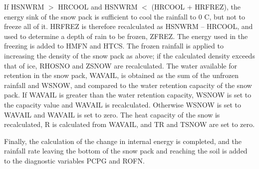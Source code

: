 If H\+S\+N\+W\+R\+M $>$ H\+R\+C\+O\+O\+L and H\+S\+N\+W\+R\+M $<$ (H\+R\+C\+O\+O\+L + H\+R\+F\+R\+E\+Z), the energy sink of the snow pack is sufficient to cool the rainfall to 0 C, but not to freeze all of it. H\+R\+F\+R\+E\+Z is therefore recalculated as H\+S\+N\+W\+R\+M – H\+R\+C\+O\+O\+L, and used to determine a depth of rain to be frozen, Z\+F\+R\+E\+Z. The energy used in the freezing is added to H\+M\+F\+N and H\+T\+C\+S. The frozen rainfall is applied to increasing the density of the snow pack as above; if the calculated density exceeds that of ice, R\+H\+O\+S\+N\+O and Z\+S\+N\+O\+W are recalculated. The water available for retention in the snow pack, W\+A\+V\+A\+I\+L, is obtained as the sum of the unfrozen rainfall and W\+S\+N\+O\+W, and compared to the water retention capacity of the snow pack. If W\+A\+V\+A\+I\+L is greater than the water retention capacity, W\+S\+N\+O\+W is set to the capacity value and W\+A\+V\+A\+I\+L is recalculated. Otherwise W\+S\+N\+O\+W is set to W\+A\+V\+A\+I\+L and W\+A\+V\+A\+I\+L is set to zero. The heat capacity of the snow is recalculated, R is calculated from W\+A\+V\+A\+I\+L, and T\+R and T\+S\+N\+O\+W are set to zero.

Finally, the calculation of the change in internal energy is completed, and the rainfall rate leaving the bottom of the snow pack and reaching the soil is added to the diagnostic variables P\+C\+P\+G and R\+O\+F\+N.